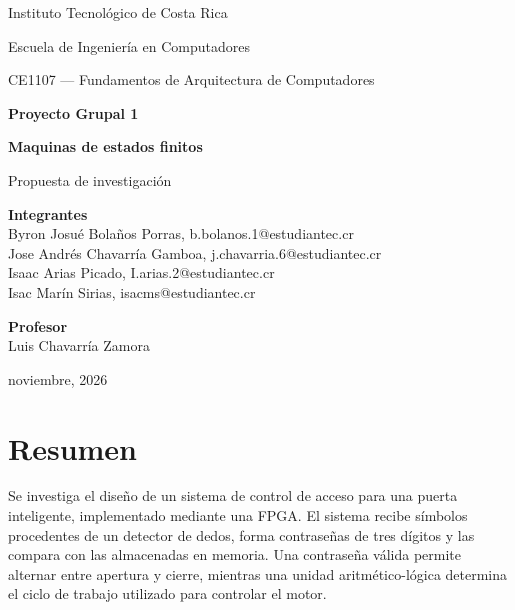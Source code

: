 \documentclass[12pt,letterpaper]{article}
\newcommand{\titulo}{
Maquinas de estados finitos
}
\begin{document}
\begin{titlepage}
    \centering

    {\large Instituto Tecnológico de Costa Rica\par}
    {\large Escuela de Ingeniería en Computadores\par}

    \vspace{1.5cm}

    {\large CE1107 --- Fundamentos de Arquitectura
    de Computadores\par}

    \vspace{1cm}

    {\Large\bfseries Proyecto Grupal 1\par}
    \vspace{0.5cm}
    {\LARGE\bfseries \titulo\par}

    \vspace{1cm}
    {\Large Propuesta de investigación\par}

    \vfill

    \textbf{Integrantes}\\
    Byron Josué Bolaños Porras, b.bolanos.1@estudiantec.cr \\
    Jose Andrés Chavarría Gamboa, j.chavarria.6@estudiantec.cr\\
    Isaac Arias Picado,  I.arias.2@estudiantec.cr \\
    Isac Marín Sirias, isacms@estudiantec.cr

    \vspace{1cm}

    \textbf{Profesor}\\
    Luis Chavarría Zamora

    \vspace{1cm}
    noviembre, 2026
\end{titlepage}

\section*{Resumen}

Se investiga el diseño de un sistema de control de acceso
para una puerta inteligente, implementado mediante una FPGA.
El sistema recibe símbolos procedentes de un detector de
dedos, forma contraseñas de tres dígitos y las compara con
las almacenadas en memoria. Una contraseña válida permite
alternar entre apertura y cierre, mientras una unidad
aritmético-lógica determina el ciclo de trabajo utilizado
para controlar el motor.
\end{document}
